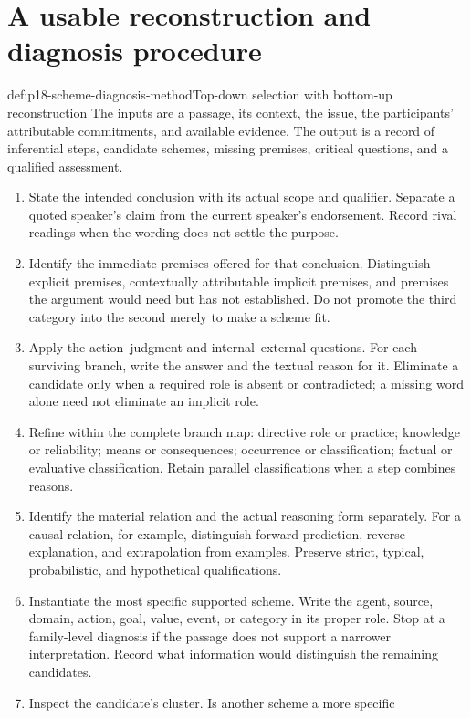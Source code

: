 \section{A usable reconstruction and diagnosis procedure}
\label{sec:p18-scheme-diagnostic-procedure}

\begin{hbmethod}{def:p18-scheme-diagnosis-method}{Top-down selection with bottom-up reconstruction}
The inputs are a passage, its context, the issue, the participants'
attributable commitments, and available evidence. The output is a
record of inferential steps, candidate schemes, missing premises,
critical questions, and a qualified assessment.
\begin{enumerate}
\item State the intended conclusion with its actual scope and qualifier.
Separate a quoted speaker's claim from the current speaker's endorsement.
Record rival readings when the wording does not settle the purpose.
\item Identify the immediate premises offered for that conclusion.
Distinguish explicit premises, contextually attributable implicit
premises, and premises the argument would need but has not established.
Do not promote the third category into the second merely to make a
scheme fit.
\item Apply the action--judgment and internal--external questions.
For each surviving branch, write the answer and the textual reason
for it. Eliminate a candidate only when a required role is absent
or contradicted; a missing word alone need not eliminate an implicit role.
\item Refine within the complete branch map: directive role or practice;
knowledge or reliability; means or consequences; occurrence or
classification; factual or evaluative classification.
Retain parallel classifications when a step combines reasons.
\item Identify the material relation and the actual reasoning form
separately. For a causal relation, for example, distinguish forward
prediction, reverse explanation, and extrapolation from examples.
Preserve strict, typical, probabilistic, and hypothetical qualifications.
\item Instantiate the most specific supported scheme. Write the
agent, source, domain, action, goal, value, event, or category in its
proper role. Stop at a family-level diagnosis if the passage does not
support a narrower interpretation. Record what information would
distinguish the remaining candidates.
\item Inspect the candidate's cluster. Is another scheme a more specific

\end{enumerate}
\end{hbmethod}
